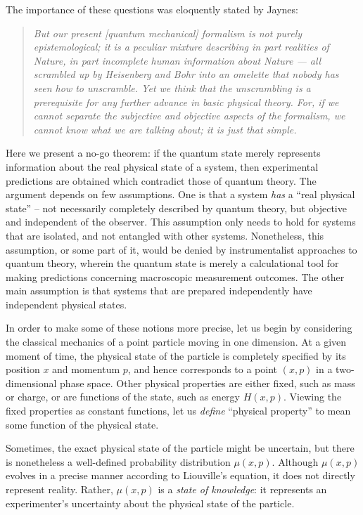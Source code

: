 \documentclass[amsmath,amssymb,superscriptaddress,twocolumn,pra]{revtex4-1}
\begin{document}
The importance of these questions was eloquently stated by Jaynes:
\begin{quotation}
\emph{But our present [quantum mechanical] formalism is not purely epistemological; it is a peculiar mixture describing in part realities of Nature, in part incomplete human information about Nature --- all scrambled up by Heisenberg and Bohr into an omelette that nobody has seen how to unscramble. Yet we think that the unscrambling is a prerequisite for any further advance in basic physical theory. For, if we cannot separate the subjective and objective aspects of the formalism, we cannot know what we are talking about; it is just that simple.\cite{jaynesquote2}}
\end{quotation}

Here we present a no-go theorem: if the quantum state merely represents information about the real physical state of a system, then experimental predictions are obtained which contradict those of quantum theory. The argument depends on few assumptions. One is that a system \emph{has} a ``real physical state'' -- not necessarily completely described by quantum theory, but objective and independent of the observer. This assumption only needs to hold for systems that are isolated, and not entangled with other systems. Nonetheless, this assumption, or some part of it, would be denied by instrumentalist approaches to quantum theory, wherein the quantum state is merely a calculational tool for making predictions concerning macroscopic measurement outcomes. The other main assumption is that systems that are prepared independently have independent physical states.

In order to make some of these notions more precise, let us begin by considering the classical mechanics of a point particle moving in one dimension. At a given moment of time, the physical state of the particle is completely specified by its position $x$ and momentum $p$, and hence corresponds to a point $(x,p)$ in a two-dimensional phase space. Other physical properties are either fixed, such as mass or charge, or are functions of the state, such as energy $H(x,p)$. Viewing the fixed properties as constant functions, let us \emph{define} ``physical property'' to mean some function of the physical state.

Sometimes, the exact physical state of the particle might be uncertain, but there is nonetheless a well-defined probability distribution $\mu(x,p)$. Although $\mu(x,p)$ evolves in a precise manner according to Liouville's equation, it does not directly represent reality. Rather, $\mu(x,p)$ is a \emph{state of knowledge}: it represents an experimenter's uncertainty about the physical state of the particle. 
\end{document}
